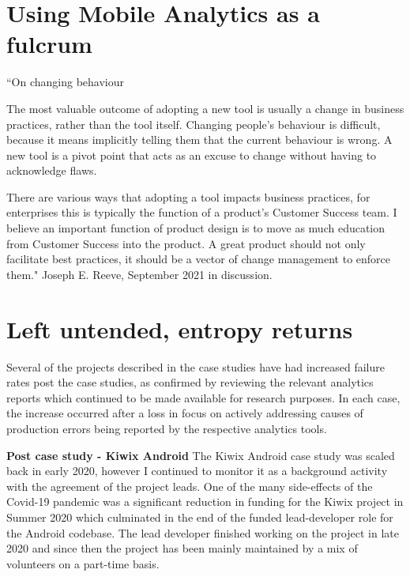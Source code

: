 \section{Using Mobile Analytics as a fulcrum}
\begin{mdframed}

``On changing behaviour

The most valuable outcome of adopting a new tool is usually a change in business practices, rather than the tool itself.
Changing people’s behaviour is difficult, because it means implicitly telling them that the current behaviour is wrong. A new tool is a pivot point that acts as an excuse to change without having to acknowledge flaws.

There are various ways that adopting a tool impacts business practices, for enterprises this is typically the function of a product’s Customer Success team. I believe an important function of product design is to move as much education from Customer Success into the product. A great product should not only facilitate best practices, it should be a vector of change management to enforce them." Joseph E. Reeve,  September 2021 in discussion.
\end{mdframed}

\section{Left untended, entropy returns}
Several of the projects described in the case studies have had increased failure rates post the case studies, as confirmed by reviewing the relevant analytics reports which continued to be made available for research purposes. In each case, the increase occurred after a loss in focus on actively addressing causes of production errors being reported by the respective analytics tools.

\textbf{Post case study - Kiwix Android}
The Kiwix Android case study was scaled back in early 2020, however I continued to monitor it as a background activity with the agreement of the project leads. One of the many side-effects of the Covid-19 pandemic was a significant reduction in funding for the Kiwix project in Summer 2020 which culminated in the end of the funded lead-developer role for the Android codebase. The lead developer finished working on the project in late 2020 and since then the project has been mainly maintained by a mix of volunteers on a part-time basis. 

